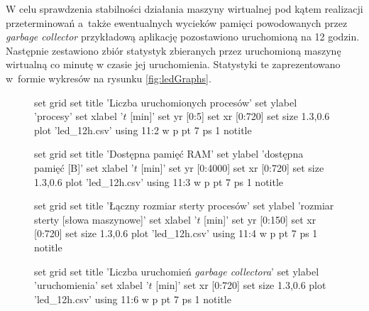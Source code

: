 W celu sprawdzenia stabilności działania maszyny wirtualnej pod kątem realizacji przeterminowań a~także ewentualnych wycieków pamięci powodowanych przez \emph{garbage collector} przykładową aplikację pozostawiono uruchomioną na 12 godzin.
Następnie zestawiono zbiór statystyk zbieranych przez uruchomioną maszynę wirtualną co minutę w czasie jej uruchomienia.
Statystyki te zaprezentowano w~formie wykresów na rysunku \ref{fig:ledGraphs}.

\begin{figure}
\begin{gnuplot}[terminal=epslatex,terminaloptions=color]
	set grid
	set title 'Liczba uruchomionych procesów'
	set ylabel 'procesy'
	set xlabel '$t$ [min]'
	set yr [0:5]
	set xr [0:720]
	set size 1.3,0.6
	plot 'led_12h.csv' using 11:2 w p pt 7 ps 1 notitle
\end{gnuplot}

\begin{gnuplot}[terminal=epslatex,terminaloptions=color]
	set grid
	set title 'Dostępna pamięć RAM'
	set ylabel 'dostępna pamięć [B]'
	set xlabel '$t$ [min]'
	set yr [0:4000]
	set xr [0:720]
	set size 1.3,0.6
	plot 'led_12h.csv' using 11:3 w p pt 7 ps 1 notitle
\end{gnuplot}

\begin{gnuplot}[terminal=epslatex,terminaloptions=color]
	set grid
	set title 'Łączny rozmiar sterty procesów'
	set ylabel 'rozmiar sterty [słowa maszynowe]'
	set xlabel '$t$ [min]'
	set yr [0:150]
	set xr [0:720]
	set size 1.3,0.6
	plot 'led_12h.csv' using 11:4 w p pt 7 ps 1 notitle
\end{gnuplot}

\begin{gnuplot}[terminal=epslatex,terminaloptions=color]
	set grid
	set title 'Liczba uruchomień \emph{garbage collectora}'
	set ylabel 'uruchomienia'
	set xlabel '$t$ [min]'
	set xr [0:720]
	set size 1.3,0.6
	plot 'led_12h.csv' using 11:6 w p pt 7 ps 1 notitle
\end{gnuplot}
\end{figure}

